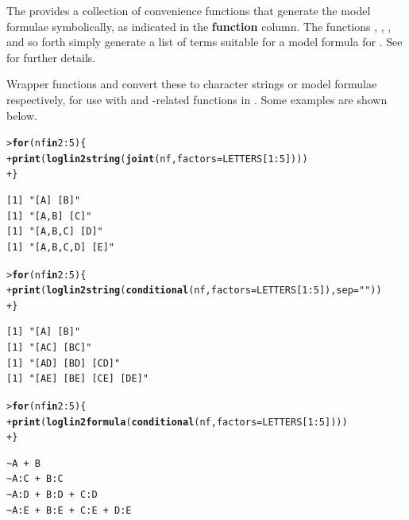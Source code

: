 \documentclass[10pt,krantz2]{krantz}\usepackage[]{graphicx}\usepackage[]{color}
\makeatletter
\newcommand{\hlnum}[1]{\textcolor[rgb]{0.686,0.059,0.569}{#1}}%
\newcommand{\hlstr}[1]{\textcolor[rgb]{0.192,0.494,0.8}{#1}}%
\newcommand{\hlopt}[1]{\textcolor[rgb]{0,0,0}{#1}}%
\newcommand{\hlstd}[1]{\textcolor[rgb]{0.345,0.345,0.345}{#1}}%
\newcommand{\hlkwa}[1]{\textcolor[rgb]{0.161,0.373,0.58}{\textbf{#1}}}%
\newcommand{\hlkwc}[1]{\textcolor[rgb]{0.333,0.667,0.333}{#1}}%
\newcommand{\hlkwd}[1]{\textcolor[rgb]{0.737,0.353,0.396}{\textbf{#1}}}%
\newenvironment{kframe}{%
 \def\at@end@of@kframe{}%
 \ifinner\ifhmode%
  \def\at@end@of@kframe{\end{minipage}}%
  \begin{minipage}{\columnwidth}%
 \fi\fi%
 \def\FrameCommand##1{\hskip\@totalleftmargin \hskip-\fboxsep
 \colorbox{shadecolor}{##1}\hskip-\fboxsep
     \hskip-\linewidth \hskip-\@totalleftmargin \hskip\columnwidth}%
 \MakeFramed {\advance\hsize-\width
   \@totalleftmargin\z@ \linewidth\hsize
   \@setminipage}}%
 {\par\unskip\endMakeFramed%
 \at@end@of@kframe}
\newenvironment{knitrout}{}{} %
\renewenvironment{knitrout}{\small\renewcommand{\baselinestretch}{.85}}{} %
\makeatother
\begin{document}
The  provides a collection of convenience functions that generate
the \loglin model formulae symbolically, as indicated in the \textbf{function} column.
The functions , , , 
and so forth simply
generate a list of terms suitable for a model formula for .
See  for further details.

Wrapper functions  and 
convert these to character strings or model formulae respectively,
for use with  and -related functions in
.  Some examples are shown below.

\begin{knitrout}
\color{fgcolor}\begin{kframe}
\begin{alltt}
\hlstd{> }\hlkwa{for}\hlstd{(nf} \hlkwa{in} \hlnum{2} \hlopt{:} \hlnum{5}\hlstd{) \{}
\hlstd{+ }  \hlkwd{print}\hlstd{(}\hlkwd{loglin2string}\hlstd{(}\hlkwd{joint}\hlstd{(nf,} \hlkwc{factors} \hlstd{= LETTERS[}\hlnum{1}\hlopt{:}\hlnum{5}\hlstd{])))}
\hlstd{+ }\hlstd{\}}
\end{alltt}
\begin{verbatim}
[1] "[A] [B]"
[1] "[A,B] [C]"
[1] "[A,B,C] [D]"
[1] "[A,B,C,D] [E]"
\end{verbatim}
\begin{alltt}
\hlstd{> }\hlkwa{for}\hlstd{(nf} \hlkwa{in} \hlnum{2} \hlopt{:} \hlnum{5}\hlstd{) \{}
\hlstd{+ }  \hlkwd{print}\hlstd{(}\hlkwd{loglin2string}\hlstd{(}\hlkwd{conditional}\hlstd{(nf,} \hlkwc{factors} \hlstd{= LETTERS[}\hlnum{1}\hlopt{:}\hlnum{5}\hlstd{]),} \hlkwc{sep} \hlstd{=} \hlstr{""}\hlstd{))}
\hlstd{+ }\hlstd{\}}
\end{alltt}
\begin{verbatim}
[1] "[A] [B]"
[1] "[AC] [BC]"
[1] "[AD] [BD] [CD]"
[1] "[AE] [BE] [CE] [DE]"
\end{verbatim}
\begin{alltt}
\hlstd{> }\hlkwa{for}\hlstd{(nf} \hlkwa{in} \hlnum{2} \hlopt{:} \hlnum{5}\hlstd{) \{}
\hlstd{+ }  \hlkwd{print}\hlstd{(}\hlkwd{loglin2formula}\hlstd{(}\hlkwd{conditional}\hlstd{(nf,} \hlkwc{factors} \hlstd{= LETTERS[}\hlnum{1}\hlopt{:}\hlnum{5}\hlstd{])))}
\hlstd{+ }\hlstd{\}}
\end{alltt}
\begin{verbatim}
~A + B
~A:C + B:C
~A:D + B:D + C:D
~A:E + B:E + C:E + D:E
\end{verbatim}
\end{kframe}
\end{knitrout}
\end{document}
